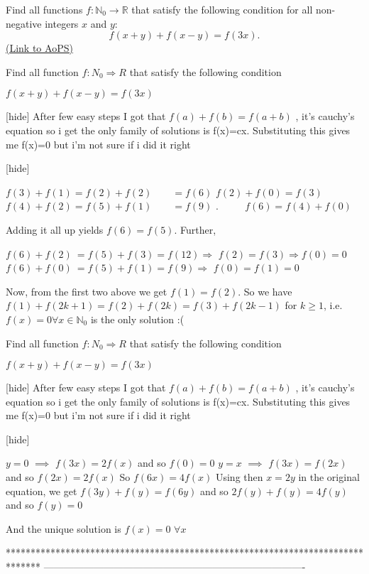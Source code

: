 \begin{problem}
	Find all functions $ f: \mathbb N_0 \to \mathbb R$ that satisfy the following condition for all non-negative integers $x$ and $y$:
\[f(x+y)+f(x-y)=f(3x).\]
	\flushright \href{https://artofproblemsolving.com/community/c6h317326}{(Link to AoPS)}
\end{problem}



\begin{solution}
	\begin{tcolorbox}Find all function $ f: N_0 \Rightarrow R$ that satisfy the following condition

$ f(x + y) + f(x - y) = f(3x)$

[hide]
After few easy steps I got that $ f(a) + f(b) = f(a + b)$ , it's cauchy's equation so i get the only family of solutions is f(x)=cx. Substituting this gives me f(x)=0 but i'm not sure if i did it right

[\/hide]\end{tcolorbox}

$ f(3) + f(1) = f(2) + f(2)\qquad = f(6)$ 
$ f(2) + f(0) = f(3)$ 
$ f(4) + f(2) = f(5) + f(1)\qquad = f(9)$ 
$ .\qquad\ \ \ f(6) = f(4) + f(0)$ 

Adding it all up yields $ f(6) = f(5)$.  Further,

$ f(6) + f(2)\ = f(5) + f(3) = f(12) \Longrightarrow$ $ f(2) = f(3)\Longrightarrow f(0) = 0$ 
$ f(6) + f(0)\ = f(5) + f(1) = f(9) \Longrightarrow$ $ f(0) = f(1) = 0$ 


Now, from the first two above we get $ f(1) = f(2)$. So we have $ f(1) + f(2k + 1) = f(2) + f(2k) = f(3) + f(2k - 1)$ for $ k\ge1$, i.e.$ f(x) = 0\forall x\in\mathbb N_0$  is the only solution :(
\end{solution}



\begin{solution}
	\begin{tcolorbox}Find all function $ f: N_0 \Rightarrow R$ that satisfy the following condition

$ f(x + y) + f(x - y) = f(3x)$

[hide]
After few easy steps I got that $ f(a) + f(b) = f(a + b)$ , it's cauchy's equation so i get the only family of solutions is f(x)=cx. Substituting this gives me f(x)=0 but i'm not sure if i did it right

[\/hide]\end{tcolorbox}

$ y=0$ $ \implies$ $ f(3x)=2f(x)$ and so $ f(0)=0$
$ y=x$ $ \implies$ $ f(3x)=f(2x)$ and so $ f(2x)=2f(x)$
So $ f(6x)=4f(x)$
Using then $ x=2y$ in the original equation, we get $ f(3y)+f(y)=f(6y)$ and so $ 2f(y)+f(y)=4f(y)$ and so $ f(y)=0$ 

And the unique solution is $ f(x)=0$ $ \forall x$
\end{solution}
*******************************************************************************
-------------------------------------------------------------------------------

